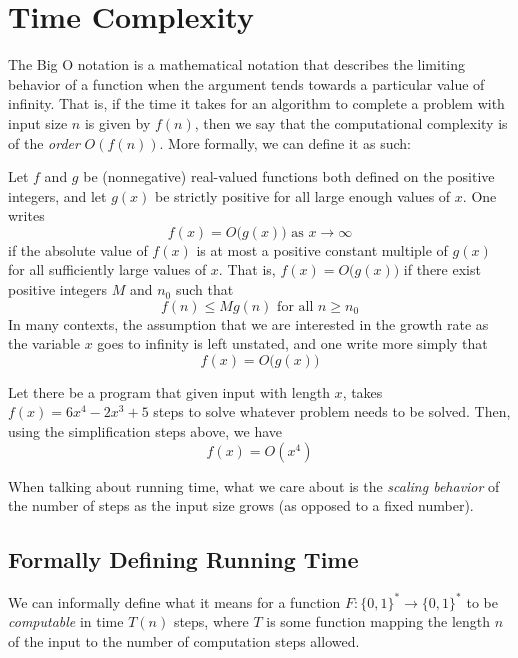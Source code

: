 \section{Time Complexity}

  The Big O notation is a mathematical notation that describes the limiting behavior of a function when the argument tends towards a particular value of infinity. That is, if the time it takes for an algorithm to complete a problem with input size $n$ is given by $f(n)$, then we say that the computational complexity is of the \textit{order} $O(f(n))$. More formally, we can define it as such: 

  \begin{definition}
    Let $f$ and $g$ be (nonnegative) real-valued functions both defined on the positive integers, and let $g(x)$ be strictly positive for all large enough values of $x$. One writes
    \[f(x) = O\big( g(x)\big) \text{ as } x \rightarrow \infty\]
    if the absolute value of $f(x)$ is at most a positive constant multiple of $g(x)$ for all sufficiently large values of $x$. That is, $f(x) = O \big(g(x)\big)$ if there exist positive integers $M$ and $n_0$ such that
    \[f(n) \leq M g(n) \text{ for all } n \geq n_0\]
    In many contexts, the assumption that we are interested in the growth rate as the variable $x$ goes to infinity is left unstated, and one write more simply that
    \[f(x) = O\big( g(x)\big)\]
  \end{definition}

  \begin{example}
    Let there be a program that given input with length $x$, takes $f(x) = 6x^4 - 2x^3 + 5$ steps to solve whatever problem needs to be solved. Then, using the simplification steps above, we have 
    \begin{equation}
      f(x) = O(x^4)
    \end{equation}
  \end{example}

  When talking about running time, what we care about is the \textit{scaling behavior} of the number of steps as the input size grows (as opposed to a fixed number). 

\subsection{Formally Defining Running Time}

  We can informally define what it means for a function $F: \{0,1\}^* \longrightarrow \{0,1\}^*$ to be \textit{computable} in time $T(n)$ steps, where $T$ is some function mapping the length $n$ of the input to the number of computation steps allowed. 

